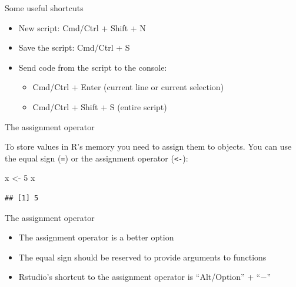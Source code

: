 \documentclass[ignorenonframetext,]{beamer}
\newenvironment{Shaded}{\begin{snugshade}}{\end{snugshade}}
\newcommand{\DecValTok}[1]{\textcolor[rgb]{0.00,0.00,0.81}{#1}}
\newcommand{\NormalTok}[1]{#1}
\newcommand{\StringTok}[1]{\textcolor[rgb]{0.31,0.60,0.02}{#1}}
\begin{document}
\begin{frame}{Some useful shortcuts}
\protect\hypertarget{some-useful-shortcuts}{}

\begin{itemize}
\item
  New script: Cmd/Ctrl + Shift + N
\item
  Save the script: Cmd/Ctrl + S
\item
  Send code from the script to the console:

  \begin{itemize}
  \item
    Cmd/Ctrl + Enter (current line or current selection)
  \item
    Cmd/Ctrl + Shift + S (entire script)
  \end{itemize}
\end{itemize}

\end{frame}

\begin{frame}[fragile]{The assignment operator}
\protect\hypertarget{the-assignment-operator}{}

To store values in R's memory you need to assign them to objects. You
can use the equal sign (\texttt{=}) or the assignment operator
(\texttt{\textless{}-}):

\begin{Shaded}
\begin{Highlighting}[]
\NormalTok{x <-}\StringTok{ }\DecValTok{5}
\NormalTok{x}
\end{Highlighting}
\end{Shaded}

\begin{verbatim}
## [1] 5
\end{verbatim}

\end{frame}

\begin{frame}{The assignment operator}
\protect\hypertarget{the-assignment-operator-1}{}

\begin{itemize}
\item
  The assignment operator is a better option
\item
  The equal sign should be reserved to provide arguments to functions
\item
  Rstudio's shortcut to the assignment operator is ``Alt/Option'' +
  ``\(-\)''
\end{itemize}

\end{frame}
\end{document}

